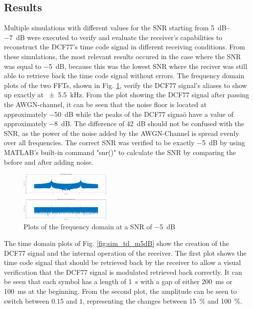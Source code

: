 \documentclass[conference]{IEEEtran}
\begin{document}
\subsection{Results}
Multiple simulations with different values for the SNR starting from \SIrange{5}{-7}{\deci\bel} were executed to verify and evaluate the receiver's capabilities to reconstruct the DCF77's time code signal in different receiving conditions.
From these simulations, the most relevant results occured in the case where the SNR was equal to \SI{-5}{\deci\bel}, because this was the lowest SNR where the reciver was still able to
retrieve back the time code signal without errors.
The frequency domain plots of the two FFTs, shown in Fig. \ref{fig:sim_fd_m5dB}, verify the DCF77 signal's aliases to show up exactly at \SI{\pm 5.5}{\kilo\hertz}.
From the plot showing the DCF77 signal after passing the AWGN-channel, it can be seen that the noise floor is located at approximately \SI{-50}{\deci\bel} while the peaks
of the DCF77 signaö have a value of approximately \SI{-8}{\deci\bel}.
The difference of \SI{42}{\deci\bel} should not be confused with the SNR, as the power of the noise added by the AWGN-Channel is spread evenly over all frequencies.
The correct SNR was verified to be exactly \SI{-5}{\deci\bel} by using MATLAB's built-in command "snr()" to calculate the SNR by comparing the before and after adding noise.
\begin{figure}[!htbp]
    \centerline{\includegraphics[width=0.4\textwidth]{img/sim_fd_m5dB.eps}}
    \caption{Plots of the frequency domain at a SNR of \SI{-5}{\deci\bel}}
    \label{fig:sim_fd_m5dB}
\end{figure}
\FloatBarrier
The time domain plots of Fig. \ref{fig:sim_td_m5dB} show the creation of the DCF77 signal and the internal operation of the receiver.
The first plot shows the time code signal that should be retrieved back by the receiver to allow a visual verification that the DCF77 signal is modulated retrieved back correctly.
It can be seen that each symbol has a length of \SI{1}{\second} with a gap of either \SI{200}{\milli\second} or \SI{100}{\milli\second} at the beginning.
From the second plot, the amplitude can be seen to switch between $0.15$ and $1$, representing the changes between \SI{15}{\percent} and \SI{100}{\percent}.
\end{document}
